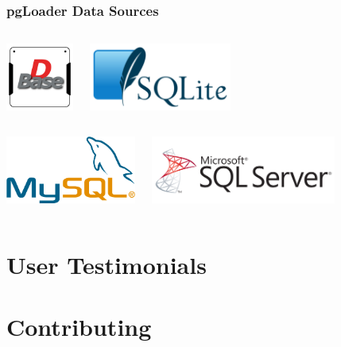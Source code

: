 \documentclass{beamer}
\begin{document}
\begin{frame}[fragile]
  \frametitle{pgLoader Data Sources}

  \begin{columns}[c]
    \begin{center}
      \includegraphics[height=6em]{dBase.png}
    \end{center}
    \begin{center}
      \includegraphics[height=6em]{SQLite.png}
    \end{center}
  \end{columns}
  
  \begin{columns}[c]
    \begin{center}
      \includegraphics[height=6em]{mysql.png}
    \end{center}
    \begin{center}
      \includegraphics[height=6em]{mssql.png}
    \end{center}
  \end{columns}
\end{frame}

\section{User Testimonials}

\section{Contributing}
\end{document}

